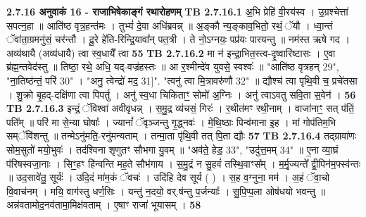 \documentclass[17pt]{extarticle}
\begin{document}
{                \textbf{ 2.7.16     अनुवाकं   16 - राजाभिषेकाङ्गं रथारोहणम्} \newline
                                \textbf{ TB 2.7.16.1} \newline
                  अ॒भि प्रेहि॑ वी॒रय॑स्व । उ॒ग्रश्चेत्ता॑ सपत्न॒हा ॥ आति॑ष्ठ वृत्र॒हन्त॑मः । तुभ्यं॑ दे॒वा अधि॑ब्रवन्न् ॥ अ॒ङ्कौ न्य॒ङ्काव॒भितो॒ रथं॒ ॅयौ । ध्वा॒न्तं ॅवा॑ता॒ग्रमनु॑सं॒ चर॑न्तौ । दू॒रे हे॑ति-रिन्द्रि॒यावा᳚न् पत॒त्री । ते नो॒ऽग्नयः॒ पप्र॑यः पारयन्तु ॥ नम॑स्त ऋषे गद । अव्य॑थायै  (अव्य॑धायै)  त्वा स्व॒धायै᳚ त्वा \textbf{ 55} \newline
                  \newline
                                \textbf{ TB 2.7.16.2} \newline
                  मा न॑ इन्द्रा॒भित॒स्त्व-दृ॒ष्वारि॑ष्टासः । ए॒वा ब्र॑ह्म॒न्तवेद॑स्तु ॥ तिष्ठा॒ रथे॒ अधि॒ यद्-वज्र॑हस्तः ॥ आ र॒श्मीन्दे॑व युवसे॒ स्वश्वः॑ ॥ "आति॑ष्ठ वृत्रहन् {29}", "ना॒तिष्ठ॑न्तं॒ परि॑ {30}" । "अनु॒ त्वेन्द्रो॑ मद॒ {31]". "त्वनु॑ त्वा मि॒त्रावरु॑णौ {32}" ॥ द्यौश्च॑ त्वा पृथि॒वी च॒ प्रचे॑तसा । शु॒क्रो बृ॒हद्-दक्षि॑णा त्वा पिपर्तु । अनु॑ स्व॒धा चिकिताꣳ॒॒ सोमो॑ अ॒ग्निः । अनु॑ त्वाऽवतु सवि॒ता स॒वेन॑ । \textbf{ 56} \newline
                  \newline
                                \textbf{ TB 2.7.16.3} \newline
                  इन्द्रं॒ ॅविश्वा॑ अवीवृधन्न् । स॒मु॒द्र व्य॑चसं॒ गिरः॑ । र॒थीत॑मꣳ रथी॒नाम् । वाजा॑नाꣳ॒॒ सत् प॑तिं॒ पति᳚म् ॥ परि॑ मा से॒न्या घोषाः᳚ । ज्यानां᳚ ॅवृञ्जन्तु गृ॒द्ध्नवः॑ । मे॒थि॒ष्ठाः पिन्व॑माना इ॒ह । मां गोप॑तिम॒भि सम्ॅवि॑शन्तु ॥ तन्मेऽनु॑मति॒-रनु॑मन्यताम् । तन्मा॒ता पृ॑थि॒वी तत् पि॒ता द्यौः \textbf{ 57} \newline
                  \newline
                                \textbf{ TB 2.7.16.4} \newline
                  तद्ग्रावा॑णः सोम॒सुतो॑ मयो॒भुवः॑ । तद॑श्विना शृणुतꣳ सौभगा यु॒वम् ॥ "अव॑ते॒ हेड॒ {33}", "उदु॑त्त॒मम् {34}" ॥ ए॒ना व्या॒घ्रं प॑रिषस्वजा॒नाः । सिꣳ॒॒हꣳ हि॑न्वन्ति मह॒ते सौभ॑गाय । स॒मु॒द्रं न सु॒हवं॑ तस्थि॒वाꣳस᳚म् । म॒र्मृ॒ज्यन्ते᳚ द्वी॒पिन॑म॒फ्स्व॑न्तः ॥ उद॒सावे॑तु॒ सूर्यः॑ । उदि॒दं मा॑म॒कं ॅवचः॑ । उदि॑हि देव सूर्य ( ) । स॒ह व॒ग्नुना॒ मम॑ । अ॒हं ॅवा॒चो वि॒वाच॑नम् । मयि॒ वाग॑स्तु धर्ण॒सिः । यन्तु॑ न॒दयो॒ वर्.ष॑न्तु प॒र्जन्याः᳚ । सु॒पि॒प्प॒ला ओष॑धयो भवन्तु ॥ अन्न॑वतामोद॒नव॑तामा॒मिक्ष॑वताम् । ए॒षाꣳ राजा॑ भूयासम् । \textbf{ 58} \newline
                  \newline
}}
\end{document}
